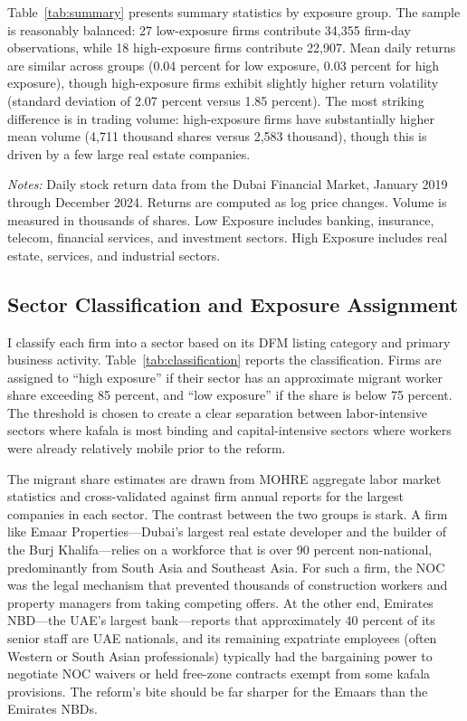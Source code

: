 \documentclass[12pt]{article}
\newcommand{\floatfoot}[1]{\par\vspace{3pt}\footnotesize\textit{Notes:} #1}
\begin{document}
Table~\ref{tab:summary} presents summary statistics by exposure group. The sample is reasonably balanced: 27 low-exposure firms contribute 34,355 firm-day observations, while 18 high-exposure firms contribute 22,907. Mean daily returns are similar across groups (0.04 percent for low exposure, 0.03 percent for high exposure), though high-exposure firms exhibit slightly higher return volatility (standard deviation of 2.07 percent versus 1.85 percent). The most striking difference is in trading volume: high-exposure firms have substantially higher mean volume (4,711 thousand shares versus 2,583 thousand), though this is driven by a few large real estate companies.

\begin{table}[H]
\centering
\caption{Summary Statistics by Exposure Group}
\label{tab:summary}
\resizebox{\textwidth}{!}{}
\floatfoot{Daily stock return data from the Dubai Financial Market, January 2019 through December 2024. Returns are computed as log price changes. Volume is measured in thousands of shares. Low Exposure includes banking, insurance, telecom, financial services, and investment sectors. High Exposure includes real estate, services, and industrial sectors.}
\end{table}

\subsection{Sector Classification and Exposure Assignment}

I classify each firm into a sector based on its DFM listing category and primary business activity. Table~\ref{tab:classification} reports the classification. Firms are assigned to ``high exposure'' if their sector has an approximate migrant worker share exceeding 85 percent, and ``low exposure'' if the share is below 75 percent. The threshold is chosen to create a clear separation between labor-intensive sectors where kafala is most binding and capital-intensive sectors where workers were already relatively mobile prior to the reform.

The migrant share estimates are drawn from MOHRE aggregate labor market statistics \citep{mohre2023stats} and cross-validated against firm annual reports for the largest companies in each sector. The contrast between the two groups is stark. A firm like Emaar Properties---Dubai's largest real estate developer and the builder of the Burj Khalifa---relies on a workforce that is over 90 percent non-national, predominantly from South Asia and Southeast Asia. For such a firm, the NOC was the legal mechanism that prevented thousands of construction workers and property managers from taking competing offers. At the other end, Emirates NBD---the UAE's largest bank---reports that approximately 40 percent of its senior staff are UAE nationals, and its remaining expatriate employees (often Western or South Asian professionals) typically had the bargaining power to negotiate NOC waivers or held free-zone contracts exempt from some kafala provisions. The reform's bite should be far sharper for the Emaars than the Emirates NBDs.
\end{document}
